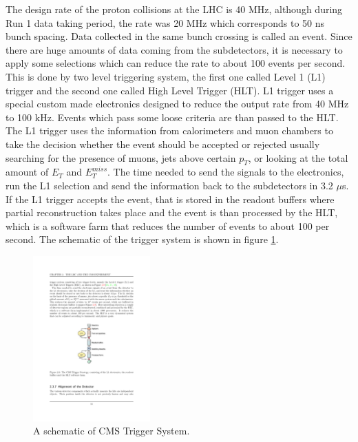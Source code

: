 The design rate of the proton collisions at the LHC is 40 MHz, although during Run 1 data taking period, the rate was 20 MHz which corresponds to 50 ns bunch spacing. Data collected in the same bunch crossing is called an event. Since there are huge amounts of data coming from the subdetectors, it is necessary to apply some selections which can reduce the rate to about 100 events per second. This is done by two level triggering system, the first one called Level 1 (L1) trigger and the second one called High Level Trigger (HLT). L1 trigger uses a special custom made electronics designed to reduce the output rate from 40 MHz to 100 kHz. Events which pass some loose criteria are than passed to the HLT. The L1 trigger uses the information from calorimeters and muon chambers to take the decision whether the event should be accepted or rejected usually searching for the presence of muons, jets above certain $p_T$, or looking at the total amount of $E_T$ and $E_T^{miss}$. The time needed to send the signals to the electronics, run the L1 selection and send the information back to the subdetectors in 3.2 $\mu$s. If the L1 trigger accepts the event, that is stored in the readout buffers where partial reconstruction takes place and the event is than processed by the HLT, which is a software farm that reduces the number of events to about 100 per second. The schematic of the trigger system is shown in figure \ref{fig:trigger}.
\begin{figure}[htbp]
	\centering
		\includegraphics[width=0.4\textwidth]{Figures/trigger.pdf}
	\caption[A drawing of CMS Trigger System.]{A schematic of CMS Trigger System. \cite{Chatrchyan:2008aa}}
	\label{fig:trigger}
\end{figure}


